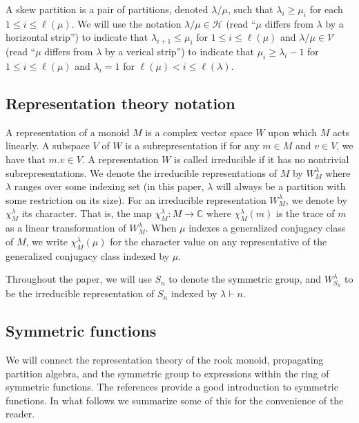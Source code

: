 \documentclass{amsart}
\theoremstyle{definition}
\begin{document}
A skew partition is a pair of partitions, denoted $\lambda/\mu$, such that $\lambda_i \geq \mu_i$ for
each $1 \leq i \leq \ell(\mu)$.
We will use the notation $\lambda/\mu \in \mathcal{H}$
(read ``$\mu$ differs from $\lambda$ by a horizontal
strip'') to indicate that $\lambda_{i+1} \leq \mu_i$
for $1\leq i\leq \ell(\mu)$
and $\lambda\slash \mu \in \mathcal{V}$
(read ``$\mu$ differs from $\lambda$ by a verical strip'')
to indicate that $\mu_i \geq \lambda_i-1$ for $1 \leq i \leq \ell(\mu)$
and $\lambda_i=1$ for $\ell(\mu) < i \leq\ell(\lambda)$.

\subsection{Representation theory notation}

A representation of a monoid $M$ is a complex vector space $W$ upon which
$M$ acts linearly. A subspace $V$ of $W$ is a subrepresentation if for any $m\in M$
and $v\in V$, we have that $m.v\in V$. A representation $W$ is called irreducible
if it has no nontrivial subrepresentations.
We denote the irreducible representations of $M$ by $W_M^\lambda$ where $\lambda$
ranges over some indexing set (in this paper, $\lambda$ will always be a partition
with some restriction on its size).
For an irreducible representation $W_M^\lambda$, we denote by $\chi_M^\lambda$ its
character. That is, the map $\chi_M^\lambda:M\to\mathbb{C}$ where $\chi_M^\lambda(m)$ is
the trace of $m$ as a linear transformation of $W_M^\lambda$.
When $\mu$ indexes a generalized conjugacy class of $M$, we write $\chi_M^\lambda(\mu)$
for the character value on any representative of the generalized conjugacy class indexed by $\mu$.

Throughout the paper, we will use $S_n$ to denote the symmetric group, and $W_{S_n}^\lambda$ to be the irreducible representation of $S_n$ indexed by $\lambda\vdash n$.

\subsection{Symmetric functions}\label{sec:sf}

We will connect the representation theory of the rook monoid, propagating partition algebra, and the symmetric group to expressions within the ring of symmetric functions. The references \cite{Macdonald, Sagan, Stanley} provide a good introduction to symmetric functions. In what follows we summarize some of this for the convenience of the reader. 
\end{document}
